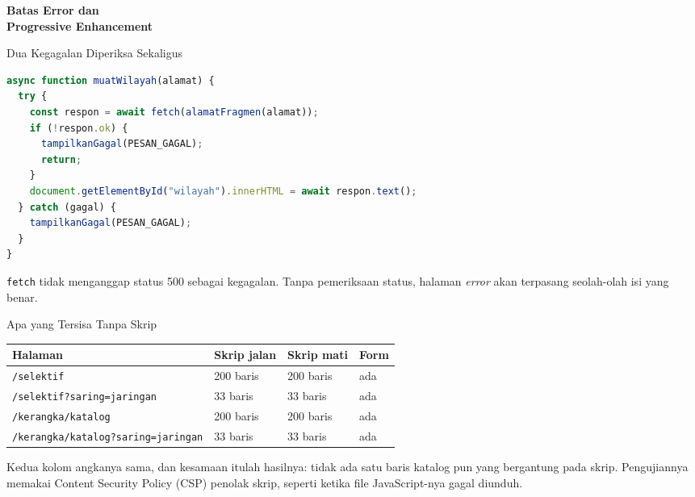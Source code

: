 \documentclass[aspectratio=169, table, 12pt]{beamer}
\begin{document}
\begin{frame}{\hfill}
  \centering
  \Huge{\textbf{Batas Error dan\\Progressive Enhancement}}
\end{frame}

\begin{frame}[fragile]{{\Large Dua Kegagalan Diperiksa Sekaligus}}
  \vspace{2pt}
\begin{lstlisting}[language=TypeScript]
async function muatWilayah(alamat) {
  try {
    const respon = await fetch(alamatFragmen(alamat));
    if (!respon.ok) {
      tampilkanGagal(PESAN_GAGAL);
      return;
    }
    document.getElementById("wilayah").innerHTML = await respon.text();
  } catch (gagal) {
    tampilkanGagal(PESAN_GAGAL);
  }
}
\end{lstlisting}
  \vspace{2pt}
  {\small \texttt{fetch} tidak menganggap status 500 sebagai kegagalan.
  Tanpa pemeriksaan status, halaman \textit{error} akan terpasang seolah-olah
  isi yang benar.}
\end{frame}

\begin{frame}{{\Large Apa yang Tersisa Tanpa Skrip}}
  \vspace{6pt}
  \centering
  {\footnotesize
  \begin{tabularx}{\textwidth}{Ylll}
    \hline
    \textbf{Halaman} & \textbf{Skrip jalan} & \textbf{Skrip mati} & \textbf{Form} \\
    \hline
    \texttt{/selektif} & 200 baris & 200 baris & ada \\
    \hline
    \texttt{/selektif?saring=jaringan} & 33 baris & 33 baris & ada \\
    \hline
    \texttt{/kerangka/katalog} & 200 baris & 200 baris & ada \\
    \hline
    \texttt{/kerangka/katalog?saring=jaringan} & 33 baris & 33 baris & ada \\
    \hline
  \end{tabularx}}

  \vspace{6pt}
  {\small Kedua kolom angkanya sama, dan kesamaan itulah hasilnya: tidak ada
  satu baris katalog pun yang bergantung pada skrip. Pengujiannya memakai Content Security Policy (CSP)
  penolak skrip, seperti ketika file JavaScript-nya gagal diunduh.}
\end{frame}
\end{document}
